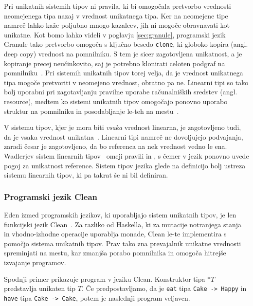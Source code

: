 Pri unikatnih sistemih tipov ni pravila, ki bi omogočala pretvorbo vrednosti neomejenega tipa nazaj v vrednost unikatnega tipa. Ker na neomejene tipe namreč lahko kaže poljubno mnogo kazalcev, jih ni mogoče obravnavati kot unikatne. Kot bomo lahko videli v poglavju \ref{sec:granule}, programski jezik Granule tako pretvorbo omogoča s ključno besedo \texttt{clone}, ki globoko kopira (angl. deep copy) vrednost na pomnilniku. S tem je sicer zagotovljena unikatnost, a je kopiranje precej neučinkovito, saj je potrebno klonirati celoten podgraf na pomnilniku~\cite{marshall2024functional}. Pri sistemih unikatnih tipov torej velja, da je vrednost unikatnega tipa mogoče pretvoriti v neomejeno vrednost, obratno pa ne. Linearni tipi so tako bolj uporabni pri zagotavljanju pravilne uporabe računalniških sredstev (angl. resource), medtem ko sistemi unikatnih tipov omogočajo ponovno uporabo struktur na pomnilniku in posodabljanje le-teh na mestu~\cite{marshall2022linearity}.

V sistemu tipov, kjer je mora biti \textit{vsaka} vrednost linearna, je zagotovljeno tudi, da je vsaka vrednost unikatna~\cite{marshall2022linearity}. Linearni tipi namreč ne dovoljujejo podvajanja, zaradi česar je zagotovljeno, da bo referenca na nek vrednost vedno le ena. Wadlerjev sistem  linearnih tipov~\cite{wadler1990linear} omeji pravili  in , s čemer v jezik ponovno uvede pogoj za unikatnost reference. Sistem tipov jezika glede na definicijo bolj ustreza sistemu linearnih tipov, ki pa takrat še ni bil definiran.

\subsubsection{Programski jezik Clean}

Eden izmed programskih jezikov, ki uporabljajo sistem unikatnih tipov, je len funkcijski jezik Clean~\cite{smetsers1994guaranteeing}. Za razliko od Haskella, ki za mutacije notranjega stanja in vhodno-izhodne operacije uporablja monade, Clean le-te implementira s pomočjo sistema unikatnih tipov. Prav tako zna prevajalnik unikatne vrednosti spreminjati na mestu, kar zmanjša porabo pomnilnika in omogoča hitrejše izvajanje programov.

Spodnji primer prikazuje program v jeziku Clean. Konstruktor tipa $*T$ predstavlja unikaten tip $T$. Če predpostavljamo, da je \texttt{eat} tipa \texttt{Cake -> Happy} in \texttt{have} tipa \texttt{Cake -> Cake}, potem je naslednji program veljaven. 

